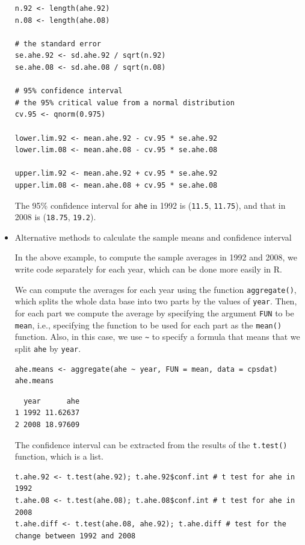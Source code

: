 \documentclass[a4paper,11pt]{article}
\begin{document}
\begin{itemize}
\begin{verbatim}
n.92 <- length(ahe.92)
n.08 <- length(ahe.08)

# the standard error
se.ahe.92 <- sd.ahe.92 / sqrt(n.92)
se.ahe.08 <- sd.ahe.08 / sqrt(n.08)

# 95% confidence interval
# the 95% critical value from a normal distribution
cv.95 <- qnorm(0.975)

lower.lim.92 <- mean.ahe.92 - cv.95 * se.ahe.92
lower.lim.08 <- mean.ahe.08 - cv.95 * se.ahe.08

upper.lim.92 <- mean.ahe.92 + cv.95 * se.ahe.92
upper.lim.08 <- mean.ahe.08 + cv.95 * se.ahe.08
\end{verbatim}

The 95\% confidence interval for \texttt{ahe} in 1992 is
(\texttt{11.5}, \texttt{11.75}), and
that in 2008 is (\texttt{18.75},
\texttt{19.2}).

\item Alternative methods to calculate the sample means and confidence interval
\label{sec:org02acbfb}

In the above example, to compute the sample averages in 1992 and 2008,
we write code separately for each year, which can be done more easily
in R.

We can compute the averages for each year using the function
\texttt{aggregate()}, which splits the whole data base into two parts by the
values of \texttt{year}. Then, for each part we compute the average by
specifying the argument \texttt{FUN} to be \texttt{mean}, i.e., specifying the
function to be used for each part as the \texttt{mean()} function. Also, in
this case, we use \texttt{\textasciitilde{}} to specify a formula that means that we split
\texttt{ahe} by \texttt{year}.

\begin{verbatim}
ahe.means <- aggregate(ahe ~ year, FUN = mean, data = cpsdat)
ahe.means
\end{verbatim}

\begin{verbatim}
  year      ahe
1 1992 11.62637
2 2008 18.97609
\end{verbatim}

The confidence interval can be extracted from the results of the
\texttt{t.test()} function, which is a list.
\begin{verbatim}
t.ahe.92 <- t.test(ahe.92); t.ahe.92$conf.int # t test for ahe in 1992
t.ahe.08 <- t.test(ahe.08); t.ahe.08$conf.int # t test for ahe in 2008
t.ahe.diff <- t.test(ahe.08, ahe.92); t.ahe.diff # test for the change between 1992 and 2008
\end{verbatim}


\end{itemize}
\end{document}

